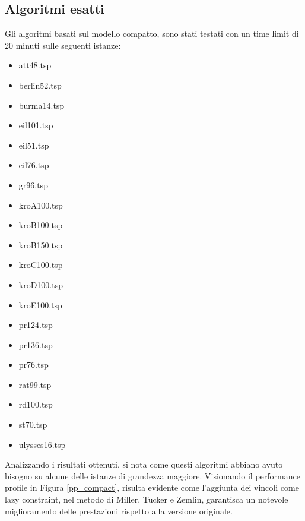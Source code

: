 \subsection{Algoritmi esatti}
Gli algoritmi basati sul modello compatto, sono stati testati con un time limit di 20 minuti sulle seguenti istanze:
\begin{center}
\begin{multicols}{3}
\begin{itemize}
\item{att48.tsp}
\item{berlin52.tsp}
\item{burma14.tsp}
\item{eil101.tsp}
\item{eil51.tsp}
\item{eil76.tsp}
\item{gr96.tsp}
\item{kroA100.tsp}
\item{kroB100.tsp}
\item{kroB150.tsp}
\item{kroC100.tsp}
\item{kroD100.tsp}
\item{kroE100.tsp}
\item{pr124.tsp}
\item{pr136.tsp}
\item{pr76.tsp}
\item{rat99.tsp}
\item{rd100.tsp}
\item{st70.tsp}
\item{ulysses16.tsp}
\end{itemize}
\end{multicols}
\end{center}
Analizzando i risultati ottenuti, si nota come questi algoritmi abbiano avuto bisogno su alcune delle istanze di grandezza maggiore. 
Visionando il performance profile in Figura \ref{pp_compact}, risulta evidente come l'aggiunta dei vincoli come lazy constraint, nel metodo di Miller, Tucker e Zemlin, garantisca un notevole miglioramento delle prestazioni rispetto alla versione originale.\\
